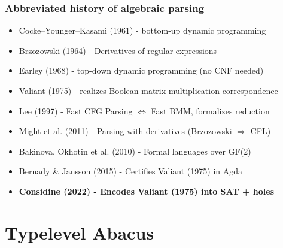 \documentclass{beamer}
\begin{document}
\begin{frame}
    \begin{frame}
        \frametitle{Abbreviated history of algebraic parsing}
        \begin{itemize}
            \item Cocke–Younger–Kasami (1961) - bottom-up dynamic programming
            \item Brzozowski (1964) - Derivatives of regular expressions
            \item Earley (1968) - top-down dynamic programming (no CNF needed)
            \item Valiant (1975) - realizes Boolean matrix multiplication correspondence
            \item Lee (1997) - Fast CFG Parsing $\Longleftrightarrow$ Fast BMM, formalizes reduction
            \item Might et al. (2011) - Parsing with derivatives (Brzozowski $\Rightarrow$ CFL)
            \item Bakinova, Okhotin et al. (2010) - Formal languages over GF(2)
            \item Bernady \& Jansson (2015) - Certifies Valiant (1975) in Agda
            \item \textbf{Considine (2022) - Encodes Valiant (1975) into SAT + holes}
        \end{itemize}
    \end{frame}

%

    \section{Typelevel Abacus}


\end{frame}
\end{document}
